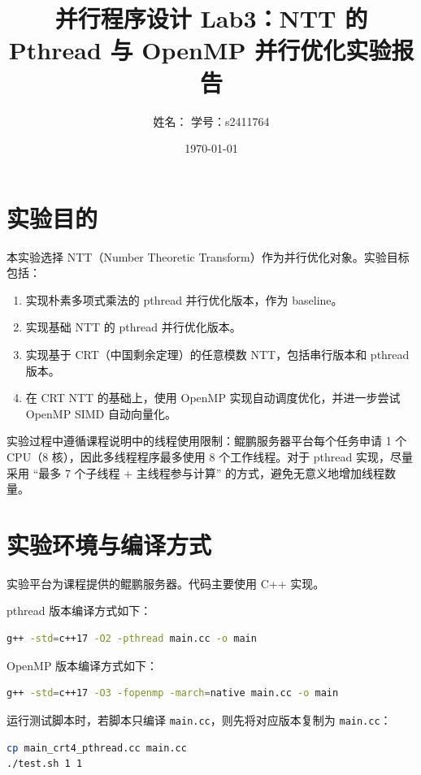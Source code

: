 \documentclass[UTF8,a4paper,12pt]{ctexart}
\title{并行程序设计 Lab3：NTT 的 Pthread 与 OpenMP 并行优化实验报告}
\author{姓名：\underline{\hspace{4cm}} \quad 学号：s2411764}
\date{\today}
\begin{document}
\maketitle

\section{实验目的}

本实验选择 NTT（Number Theoretic Transform）作为并行优化对象。实验目标包括：

\begin{enumerate}
  \item 实现朴素多项式乘法的 pthread 并行优化版本，作为 baseline。
  \item 实现基础 NTT 的 pthread 并行优化版本。
  \item 实现基于 CRT（中国剩余定理）的任意模数 NTT，包括串行版本和 pthread 版本。
  \item 在 CRT NTT 的基础上，使用 OpenMP 实现自动调度优化，并进一步尝试 OpenMP SIMD 自动向量化。
\end{enumerate}

实验过程中遵循课程说明中的线程使用限制：鲲鹏服务器平台每个任务申请 1 个 CPU（8 核），因此多线程程序最多使用 8 个工作线程。对于 pthread 实现，尽量采用 ``最多 7 个子线程 + 主线程参与计算'' 的方式，避免无意义地增加线程数量。

\section{实验环境与编译方式}

实验平台为课程提供的鲲鹏服务器。代码主要使用 C++ 实现。

pthread 版本编译方式如下：

\begin{lstlisting}[language=bash]
g++ -std=c++17 -O2 -pthread main.cc -o main
\end{lstlisting}

OpenMP 版本编译方式如下：

\begin{lstlisting}[language=bash]
g++ -std=c++17 -O3 -fopenmp -march=native main.cc -o main
\end{lstlisting}

运行测试脚本时，若脚本只编译 \texttt{main.cc}，则先将对应版本复制为 \texttt{main.cc}：

\begin{lstlisting}[language=bash]
cp main_crt4_pthread.cc main.cc
./test.sh 1 1
\end{lstlisting}
\end{document}
